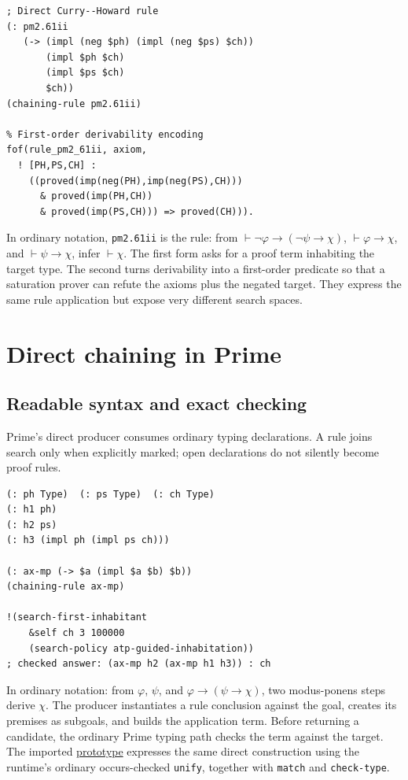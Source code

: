 \documentclass[10pt]{article}
\begin{document}
\begin{lstlisting}
; Direct Curry--Howard rule
(: pm2.61ii
   (-> (impl (neg $ph) (impl (neg $ps) $ch))
       (impl $ph $ch)
       (impl $ps $ch)
       $ch))
(chaining-rule pm2.61ii)

% First-order derivability encoding
fof(rule_pm2_61ii, axiom,
  ! [PH,PS,CH] :
    ((proved(imp(neg(PH),imp(neg(PS),CH)))
      & proved(imp(PH,CH))
      & proved(imp(PS,CH))) => proved(CH))).
\end{lstlisting}

In ordinary notation, \texttt{pm2.61ii} is the rule: from
$\vdash\neg\varphi\to(\neg\psi\to\chi)$, $\vdash\varphi\to\chi$, and
$\vdash\psi\to\chi$, infer $\vdash\chi$.
The first form asks for a proof term inhabiting the target type.  The second
turns derivability into a first-order predicate so that a saturation prover
can refute the axioms plus the negated target.  They express the same rule
application but expose very different search spaces.

\section{Direct chaining in Prime}

\subsection{Readable syntax and exact checking}

Prime's direct producer consumes ordinary typing declarations.  A rule joins
search only when explicitly marked; open declarations do not silently become
proof rules.

\begin{lstlisting}
(: ph Type)  (: ps Type)  (: ch Type)
(: h1 ph)
(: h2 ps)
(: h3 (impl ph (impl ps ch)))

(: ax-mp (-> $a (impl $a $b) $b))
(chaining-rule ax-mp)

!(search-first-inhabitant
    &self ch 3 100000
    (search-policy atp-guided-inhabitation))
; checked answer: (ax-mp h2 (ax-mp h1 h3)) : ch
\end{lstlisting}

In ordinary notation: from $\varphi$, $\psi$, and $\varphi\to(\psi\to\chi)$,
two modus-ponens steps derive $\chi$.
The producer instantiates a rule conclusion against the goal, creates its
premises as subgoals, and builds the application term.  Before returning a
candidate, the ordinary Prime typing path checks the term against the target.
The imported
\href{https://github.com/zariuq/CeTTa/blob/cetta-he-prime-dtt-chainer-20260715/lib/lib_atp.metta}
{ prototype} expresses the same direct construction using the
runtime's ordinary occurs-checked \texttt{unify}, together with \texttt{match}
and \texttt{check-type}.
\end{document}
